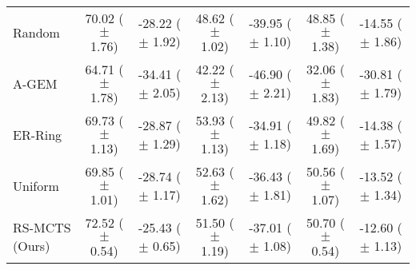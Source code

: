 \begin{table}[t]
{\begin{tabular}{l c c c c c c}
        \midrule 
        Random & 70.02 ($\pm$ 1.76) & -28.22 ($\pm$ 1.92) & 48.62 ($\pm$ 1.02) & -39.95 ($\pm$ 1.10) & 48.85 ($\pm$ 1.38) & -14.55 ($\pm$ 1.86) \\
        A-GEM & 64.71 ($\pm$ 1.78) & -34.41 ($\pm$ 2.05) & 42.22 ($\pm$ 2.13) & -46.90 ($\pm$ 2.21) & 32.06 ($\pm$ 1.83) & -30.81 ($\pm$ 1.79) \\
        ER-Ring & 69.73 ($\pm$ 1.13) & -28.87 ($\pm$ 1.29) & 53.93 ($\pm$ 1.13) & -34.91 ($\pm$ 1.18) & 49.82 ($\pm$ 1.69) & -14.38 ($\pm$ 1.57) \\ 
        Uniform & 69.85 ($\pm$ 1.01) & -28.74 ($\pm$ 1.17) & 52.63 ($\pm$ 1.62) & -36.43 ($\pm$ 1.81) &  50.56 ($\pm$ 1.07) & -13.52 ($\pm$ 1.34) \\ 
        \midrule 
        RS-MCTS (Ours) & 72.52 ($\pm$ 0.54) & -25.43 ($\pm$ 0.65) & 51.50 ($\pm$ 1.19) & -37.01 ($\pm$ 1.08) & 50.70 ($\pm$ 0.54) & -12.60 ($\pm$ 1.13)  \\ 
        \bottomrule
    \end{tabular}
    }
    \vspace{-2mm}
    \label{tab:bwt_efficiency_of_replay_scheduling}
\end{table}

